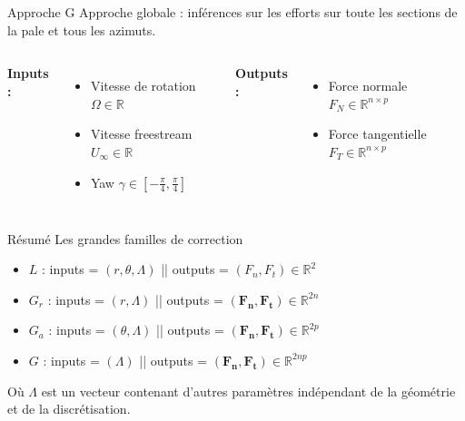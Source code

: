 \documentclass[
11pt,notheorems,hyperref={pdfauthor=whatever}
]{beamer}
\begin{document}
\begin{frame}{Approche G}
Approche globale : inférences sur les efforts sur toute les sections de la pale et tous les azimuts.

    \vspace{0.3cm}

    \begin{columns}[c]
        \textbf{Inputs :}
        \begin{itemize}\small
            \item Vitesse de rotation $\Omega \in \mathbb{R}$
            \item Vitesse freestream $U_{\infty} \in \mathbb{R}$
            \item Yaw $\gamma \in \left[-\frac{\pi}{4}, \frac{\pi}{4}\right]$
        \end{itemize}

        \centering

        \textbf{Outputs :}
        \begin{itemize}\small
            \item Force normale $F_N \in \mathbb{R}^{n \times p}$
            \item Force tangentielle $F_T \in \mathbb{R}^{n \times p}$
        \end{itemize}
    \end{columns}    
\end{frame}


\begin{frame}{Résumé}
    Les grandes familles de correction 
    \begin{itemize}
        \item \centering  $L$ :     inputs = $(r, \theta, \Lambda)$     || outputs = $(F_n, F_t) \in \mathbb{R}^2$
        \item \centering  $G_r$ :   inputs = $(r, \Lambda)$             || outputs = $(\mathbf{F_n}, \mathbf{F_t}) \in \mathbb{R}^{2n}$
        \item \centering  $G_a$ :   inputs = $(\theta, \Lambda)$        || outputs = $(\mathbf{F_n}, \mathbf{F_t}) \in \mathbb{R}^{2p}$
        \item \centering  $G$ :     inputs = $(\Lambda)$                || outputs = $(\mathbf{F_n}, \mathbf{F_t}) \in \mathbb{R}^{2np}$
    \end{itemize}

     \vspace{0.3cm}

     Où $\Lambda$ est un vecteur contenant d'autres paramètres indépendant de la géométrie et de la discrétisation.
\end{frame}
\end{document}
